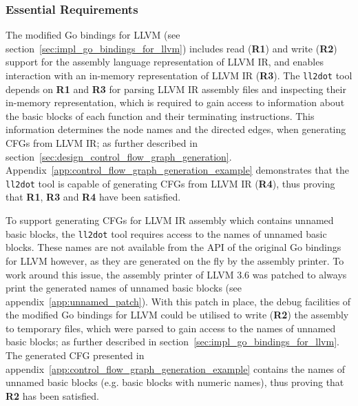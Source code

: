 
\subsubsection{Essential Requirements}
\label{sec:eval_llvm_ir_library_essential_requirements}


The modified Go bindings for LLVM (see section~\ref{sec:impl_go_bindings_for_llvm}) includes read (\textbf{R1}) and write (\textbf{R2}) support for the assembly language representation of LLVM IR, and enables interaction with an in-memory representation of LLVM IR (\textbf{R3}). The \texttt{ll2dot} tool depends on \textbf{R1} and \textbf{R3} for parsing LLVM IR assembly files and inspecting their in-memory representation, which is required to gain access to information about the basic blocks of each function and their terminating instructions. This information determines the node names and the directed edges, when generating CFGs from LLVM IR; as further described in section~\ref{sec:design_control_flow_graph_generation}. Appendix~\ref{app:control_flow_graph_generation_example} demonstrates that the \texttt{ll2dot} tool is capable of generating CFGs from LLVM IR (\textbf{R4}), thus proving that \textbf{R1}, \textbf{R3} and \textbf{R4} have been satisfied.


To support generating CFGs for LLVM IR assembly which contains unnamed basic blocks, the \texttt{ll2dot} tool requires access to the names of unnamed basic blocks. These names are not available from the API of the original Go bindings for LLVM however, as they are generated on the fly by the assembly printer. To work around this issue, the assembly printer of LLVM 3.6 was patched to always print the generated names of unnamed basic blocks (see appendix~\ref{app:unnamed_patch}). With this patch in place, the debug facilities of the modified Go bindings for LLVM could be utilised to write (\textbf{R2}) the assembly to temporary files, which were parsed to gain access to the names of unnamed basic blocks; as further described in section~\ref{sec:impl_go_bindings_for_llvm}. The generated CFG presented in appendix~\ref{app:control_flow_graph_generation_example} contains the names of unnamed basic blocks (e.g. basic blocks with numeric names), thus proving that \textbf{R2} has been satisfied.
